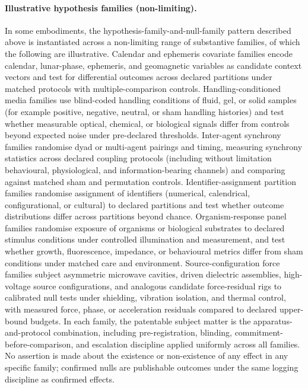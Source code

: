 \documentclass[a4paper,12pt]{article}
\begin{document}
\paragraph{Illustrative hypothesis families (non-limiting).}
In some embodiments, the hypothesis-family-and-null-family pattern
described above is instantiated across a non-limiting range of
substantive families, of which the following are illustrative.
Calendar and ephemeris covariate families encode calendar,
lunar-phase, ephemeris, and geomagnetic variables as candidate
context vectors and test for differential outcomes across declared
partitions under matched protocols with multiple-comparison controls.
Handling-conditioned media families use blind-coded handling
conditions of fluid, gel, or solid samples (for example positive,
negative, neutral, or sham handling histories) and test whether
measurable optical, chemical, or biological signals differ from
controls beyond expected noise under pre-declared thresholds.
Inter-agent synchrony families randomise dyad or multi-agent
pairings and timing, measuring synchrony statistics across declared
coupling protocols (including without limitation behavioural,
physiological, and information-bearing channels) and comparing
against matched sham and permutation controls. Identifier-assignment
partition families randomise assignment of identifiers (numerical,
calendrical, configurational, or cultural) to declared partitions
and test whether outcome distributions differ across partitions
beyond chance. Organism-response panel families randomise exposure
of organisms or biological substrates to declared stimulus
conditions under controlled illumination and measurement, and test
whether growth, fluorescence, impedance, or behavioural metrics
differ from sham conditions under matched care and environment.
Source-configuration force families subject asymmetric microwave
cavities, driven dielectric assemblies, high-voltage source
configurations, and analogous candidate force-residual rigs to
calibrated null tests under shielding, vibration isolation, and
thermal control, with measured force, phase, or acceleration
residuals compared to declared upper-bound budgets. In each family,
the patentable subject matter is the apparatus-and-protocol
combination, including pre-registration, blinding,
commitment-before-comparison, and escalation discipline applied
uniformly across all families. No assertion is made about the
existence or non-existence of any effect in any specific family;
confirmed nulls are publishable outcomes under the same logging
discipline as confirmed effects.
\end{document}
